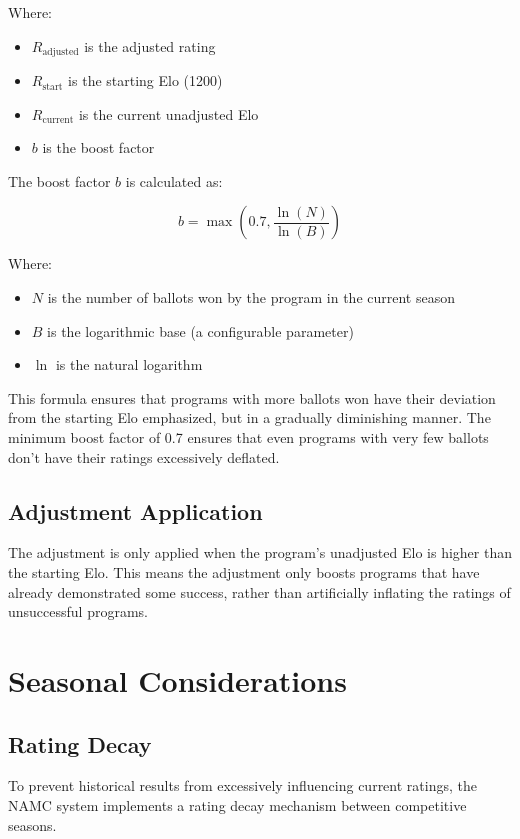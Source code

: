 \documentclass[11pt]{article}
\begin{document}
Where:
\begin{itemize}
    \item $R_{\text{adjusted}}$ is the adjusted rating
    \item $R_{\text{start}}$ is the starting Elo (1200)
    \item $R_{\text{current}}$ is the current unadjusted Elo
    \item $b$ is the boost factor
\end{itemize}

The boost factor $b$ is calculated as:

\begin{equation}
b = \max\left(0.7, \frac{\ln(N)}{\ln(B)}\right)
\end{equation}

Where:
\begin{itemize}
    \item $N$ is the number of ballots won by the program in the current season
    \item $B$ is the logarithmic base (a configurable parameter)
    \item $\ln$ is the natural logarithm
\end{itemize}

This formula ensures that programs with more ballots won have their deviation from the starting Elo emphasized, but in a gradually diminishing manner. The minimum boost factor of 0.7 ensures that even programs with very few ballots don't have their ratings excessively deflated.

\subsection{Adjustment Application}

The adjustment is only applied when the program's unadjusted Elo is higher than the starting Elo. This means the adjustment only boosts programs that have already demonstrated some success, rather than artificially inflating the ratings of unsuccessful programs.

\section{Seasonal Considerations}

\subsection{Rating Decay}

To prevent historical results from excessively influencing current ratings, the NAMC system implements a rating decay mechanism between competitive seasons.
\end{document}

